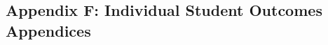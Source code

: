 \documentclass[12pt]{article}
\begin{document}
\subsection*{Appendix F: Individual Student Outcomes Appendices}

\newpage
\end{document}
